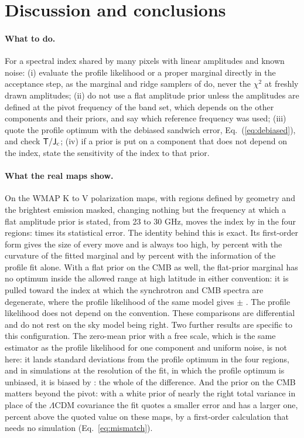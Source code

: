 \section{Discussion and conclusions}
\label{sec:concl}

\paragraph{What to do.} For a spectral index shared by many pixels with linear amplitudes and known
noise: (i) evaluate the profile likelihood or a proper marginal directly in the acceptance step, as
the marginal and ridge samplers of \citet{andersen2023} do, never the $\chi^2$ at freshly drawn
amplitudes; (ii) do not use a flat amplitude prior unless the amplitudes are defined at the pivot
frequency of the band set, which depends on the other components and their priors, and say which
reference frequency was used; (iii) quote the profile optimum with the debiased sandwich error,
Eq.~(\ref{eq:debiased}), and check $\mathsf{T}/\mathsf{J}_{\rm c}$; (iv) if a prior is put on a component that does
not depend on the index, state the sensitivity of the index to that prior.

\paragraph{What the real maps show.} On the WMAP K to V polarization maps, with regions defined by
geometry and the brightest emission masked, changing nothing but the frequency at which a flat
amplitude prior is stated, from 23 to 30 GHz, moves the index by  in the four
regions:  times its statistical error. The identity behind this is exact. Its
first-order form gives the size of every move and is always too high, by  percent
with the curvature of the fitted marginal and by  percent with the information of
the profile fit alone. With a flat prior on the CMB as well, the flat-prior marginal has no optimum
inside the allowed range at high latitude in either convention: it is pulled toward the index at
which the synchrotron and CMB spectra are degenerate, where the profile likelihood of the same model
gives  $\pm$ . The profile likelihood does not depend on the
convention. These comparisons are differential and do not rest on the sky model being right. Two
further results are specific to this configuration. The zero-mean prior with a free scale, which is
the same estimator as the profile likelihood for one component and uniform noise, is not here: it
lands  standard deviations from the profile optimum in the four regions, and in
simulations at the resolution of the fit, in which the profile optimum is unbiased, it is biased by
: the whole of the difference. And the prior on the CMB matters beyond the pivot: with a white prior of nearly the right
total variance in place of the $\Lambda$CDM covariance the fit quotes a smaller error and has a larger
one,  percent above the quoted value on these maps, by a first-order calculation
that needs no simulation (Eq.~\ref{eq:mismatch}).

